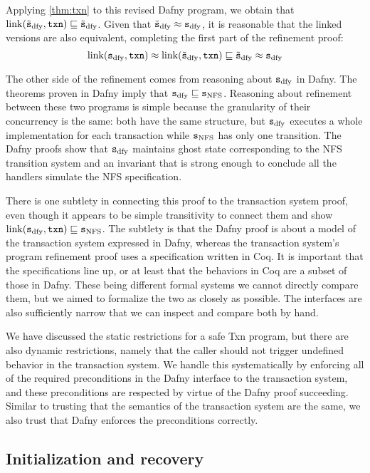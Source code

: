 Applying \autoref{thm:txn} to this revised Dafny program, we obtain that
$\mathrm{link}(\tilde{\texttt{s}}_{\mathrm{dfy}}, \texttt{txn}) \sqsubseteq \tilde{\texttt{s}}_{\mathrm{dfy}}$. Given that $\tilde{\texttt{s}}_{\mathrm{dfy}} \approx \texttt{s}_{\mathrm{dfy}}$, it is
reasonable that the linked versions are also equivalent, completing the first
part of the refinement proof:
\[
  \mathrm{link}(\texttt{s}_{\mathrm{dfy}}, \texttt{txn}) \approx \mathrm{link}(\tilde{\texttt{s}}_{\mathrm{dfy}}, \texttt{txn}) \sqsubseteq \tilde{\texttt{s}}_{\mathrm{dfy}} \approx \texttt{s}_{\mathrm{dfy}}
\]

The other side of the refinement comes from reasoning about $\texttt{s}_{\mathrm{dfy}}$ in Dafny.
The theorems proven in Dafny imply that $\texttt{s}_{\mathrm{dfy}} \sqsubseteq \texttt{s}_{\mathrm{NFS}}$. Reasoning about
refinement between these two programs is simple because the granularity of their
concurrency is the same: both have the same structure, but $\texttt{s}_{\mathrm{dfy}}$ executes a
whole implementation for each transaction while $\texttt{s}_{\mathrm{NFS}}$ has only one transition.
The Dafny proofs show that $\texttt{s}_{\mathrm{dfy}}$ maintains ghost state corresponding to the
NFS transition system and an invariant that is strong enough to conclude all the
handlers simulate the NFS specification.

There is one subtlety in connecting this proof to the transaction system proof,
even though it appears to be simple transitivity to connect them and show
$\mathrm{link}(\texttt{s}_{\mathrm{dfy}}, \texttt{txn}) \sqsubseteq \texttt{s}_{\mathrm{NFS}}$. The subtlety is that the Dafny proof is about a
model of the transaction system expressed in Dafny, whereas the transaction
system's program refinement proof uses a specification written in Coq. It is
important that the specifications line up, or at least that the behaviors in Coq
are a subset of those in Dafny. These being different formal systems we cannot
directly compare them, but we aimed to formalize the two as closely as possible.
The interfaces are also sufficiently narrow that we can inspect and compare both
by hand.

We have discussed the static restrictions for a safe Txn program, but there are
also dynamic restrictions, namely that the caller should not trigger undefined
behavior in the transaction system. We handle this systematically by enforcing
all of the required preconditions in the Dafny interface to the transaction
system, and these preconditions are respected by virtue of the Dafny proof
succeeding. Similar to trusting that the semantics of the transaction system are
the same, we also trust that Dafny enforces the preconditions correctly.

\subsection{Initialization and recovery}

